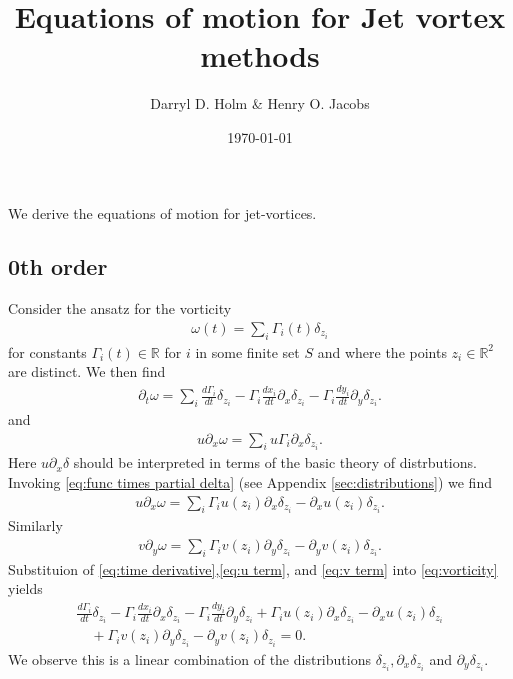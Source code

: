 \documentclass[12pt]{amsart}
\title{Equations of motion for Jet vortex methods}
\author{Darryl D. Holm \& Henry O. Jacobs}
\date{\today}
\newcommand{\R}{\ensuremath{\mathbb{R}}}
\theoremstyle{remark}
\begin{document}
\maketitle
We derive the equations of motion for jet-vortices.

\subsection{0th order}
Consider the ansatz for the vorticity
\begin{align}
  \omega(t) = \sum_{i} \Gamma_i(t) \delta_{z_i} \label{eq:ansatz 0}
\end{align}
for constants $\Gamma_i(t) \in \R$ for $i$ in some finite set $S$
and where the points $z_i \in \R^2$ are distinct.
We then find
\begin{align}
  \partial_t \omega = \sum_{i} \frac{d \Gamma_i}{dt} \delta_{z_i} 
  - \Gamma_i \frac{dx_i}{dt} \partial_x \delta_{z_i}
  - \Gamma_i \frac{dy_i}{dt} \partial_y \delta_{z_i}.
  \label{eq:time derivative}
\end{align}
and
\begin{align*}
  u \partial_x \omega = \sum_{i} u \Gamma_i \partial_x \delta_{z_i}.
\end{align*}
Here $u \partial_x \delta$ should be interpreted
in terms of the basic theory of distrbutions.
Invoking \eqref{eq:func times partial delta} (see Appendix
\ref{sec:distributions}) we find
\begin{align}
  u \partial_x \omega = \sum_{i} \Gamma_i u(z_i) \partial_x \delta_{z_i} - \partial_x u(z_i) \delta_{z_i}. \label{eq:u term}
\end{align}
Similarly
\begin{align}
    v \partial_y \omega = \sum_{i} \Gamma_i v(z_i) \partial_y \delta_{z_i} - \partial_y v(z_i) \delta_{z_i}. \label{eq:v term}
\end{align}
Substituion of \eqref{eq:time derivative},\eqref{eq:u term},
and \eqref{eq:v term} into \eqref{eq:vorticity} yields
\begin{align*}
\frac{d \Gamma_i}{dt} \delta_{z_i} 
  - \Gamma_i \frac{dx_i}{dt} \partial_x \delta_{z_i}
  - \Gamma_i \frac{dy_i}{dt} \partial_y \delta_{z_i}
  + \Gamma_i u(z_i) \partial_x \delta_{z_i} - \partial_x u(z_i) \delta_{z_i}\\
  \quad + \Gamma_i v(z_i) \partial_y \delta_{z_i} - \partial_y v(z_i) \delta_{z_i} =  0.
\end{align*}
We observe this is a linear combination of the distributions $\delta_{z_i},\partial_x\delta_{z_i}$ and $\partial_y \delta_{z_i}$.
\end{document}
